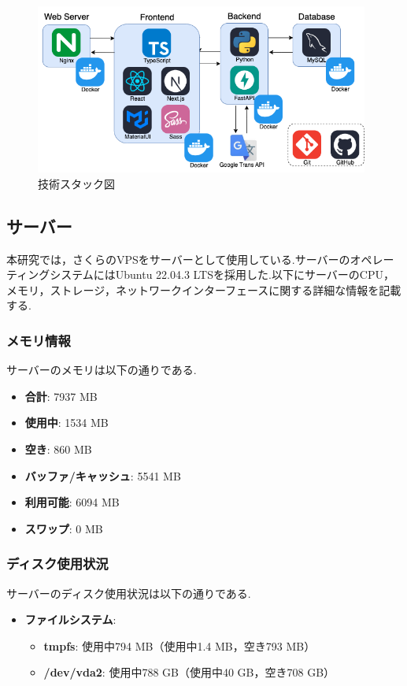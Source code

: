 \documentclass[b5paper,12pt,dvipdfmx]{jsreport}
\begin{document}
\begin{figure}[H]
	\centering
    \includegraphics[width=110mm,height=55.87mm]{./img/system/.png}
	\caption{技術スタック図}
	\label{fig:tech_stack}
\end{figure}


\subsection{サーバー}
本研究では，さくらのVPSをサーバーとして使用している.サーバーのオペレーティングシステムにはUbuntu 22.04.3 LTSを採用した.以下にサーバーのCPU，メモリ，ストレージ，ネットワークインターフェースに関する詳細な情報を記載する.


\subsubsection{メモリ情報}
サーバーのメモリは以下の通りである.
\begin{itemize}
    \item \textbf{合計}: 7937 MB
    \item \textbf{使用中}: 1534 MB
    \item \textbf{空き}: 860 MB
    \item \textbf{バッファ/キャッシュ}: 5541 MB
    \item \textbf{利用可能}: 6094 MB
    \item \textbf{スワップ}: 0 MB
\end{itemize}


\subsubsection{ディスク使用状況}
サーバーのディスク使用状況は以下の通りである.
\begin{itemize}
    \item \textbf{ファイルシステム}:
    \begin{itemize}
        \item \textbf{tmpfs}: 使用中794 MB（使用中1.4 MB，空き793 MB）
        \item \textbf{/dev/vda2}: 使用中788 GB（使用中40 GB，空き708 GB）
    \end{itemize}
\end{itemize}
\end{document}
